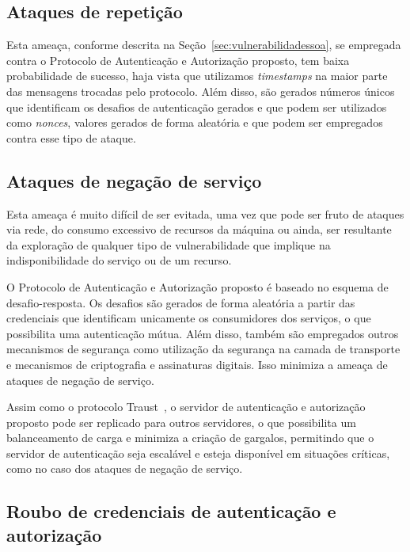 \subsection{Ataques de repetição}

Esta ameaça, conforme descrita na Seção~\ref{sec:vulnerabilidadessoa}, se empregada contra o Protocolo de Autenticação e Autorização proposto, tem baixa probabilidade de sucesso, haja vista que utilizamos \emph{timestamps} na maior parte das mensagens trocadas pelo protocolo. Além disso, são gerados números únicos que identificam os desafios de autenticação gerados e que podem ser utilizados como \emph{nonces}, valores gerados de forma aleat\'{o}ria e que podem ser empregados contra esse tipo de ataque.

\subsection{Ataques de negação de serviço}

Esta ameaça é muito difícil de ser evitada, uma vez que pode ser fruto de ataques via rede, do consumo excessivo de recursos da máquina  ou ainda, ser resultante da exploração de qualquer tipo de vulnerabilidade que implique na indisponibilidade do serviço ou de um recurso.

O Protocolo de Autenticação e Autorização proposto é baseado no esquema de desafio-resposta. Os desafios são gerados de forma aleatória a partir das credenciais que identificam unicamente os consumidores dos serviços, o que possibilita uma autenticação mútua. Além disso, também são empregados outros mecanismos de segurança como utilização da segurança na camada de transporte e mecanismos de criptografia e assinaturas digitais. Isso minimiza a ameaça de ataques de negação de serviço.

Assim como o protocolo Traust~\cite{traust08}, o servidor de autenticação e autorização proposto pode ser replicado para outros servidores, o que possibilita um balanceamento de carga e minimiza a criação de gargalos, permitindo que o servidor de autenticação seja escalável e esteja disponível em situações críticas, como no caso dos ataques de negação de serviço.


\subsection{Roubo de credenciais de autenticação e autorização}\label{subsec:RouboCred}

